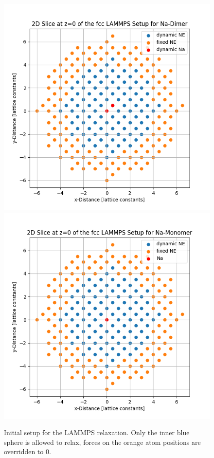 \begin{figure}[h!]
	\centering
	\includegraphics[scale=0.45]{Inhalt/Bilder/lammps_dimer_setup.png}
	\includegraphics[scale=0.45]{Inhalt/Bilder/lammps_mono_setup.png}
	\caption{Initial setup for the \ac{LAMMPS} relaxation. Only the inner blue sphere is allowed to relax, forces on the orange atom positions are overridden to 0.}
	\label{fig:lammpssetup}
\end{figure}\\%
